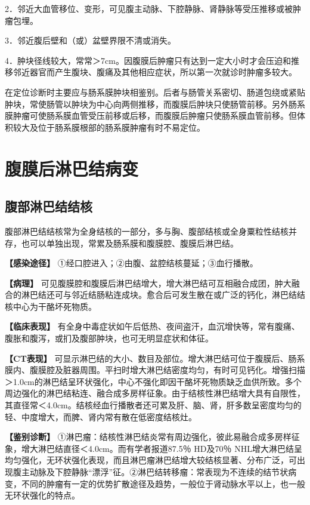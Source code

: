 2．邻近大血管移位、变形，可见腹主动脉、下腔静脉、肾静脉等受压推移或被肿瘤包埋。

3．邻近腹后壁和（或）盆壁界限不清或消失。

4．肿块径线较大，常常＞7cm。因腹膜后肿瘤只有达到一定大小时才会压迫和推移邻近器官而产生腹块、腹痛及其他相应症状，所以第一次就诊时肿瘤多较大。

在定位诊断时主要应与肠系膜肿块相鉴别。后者与肠管关系密切、肠道包绕或紧贴肿块，常使肠管以肿块为中心向两侧推移，而腹膜后肿块只使肠管前移。另外肠系膜肿瘤可使肠系膜血管受压前移或后移，而腹膜后肿瘤只使肠系膜血管前移。但体积较大及位于肠系膜根部的肠系膜肿瘤有时不易定位。

\section{腹膜后淋巴结病变}

\subsection{腹部淋巴结结核}

腹部淋巴结结核常为全身结核的一部分，多与胸、腹部结核或全身粟粒性结核并存，也可以单独出现，常累及肠系膜和腹膜腔、腹膜后淋巴结。

\textbf{【感染途径】} ①经口腔进入；②由腹、盆腔结核蔓延；③血行播散。

\textbf{【病理】}
可见腹膜腔和腹膜后淋巴结增大，增大淋巴结可互相融合成团，肿大融合的淋巴结还可与邻近结肠粘连成块。愈合后可发生散在或广泛的钙化，淋巴结结核中心为干酪坏死物质。

\textbf{【临床表现】}
有全身中毒症状如午后低热、夜间盗汗，血沉增快等，常有腹痛、腹胀和腹泻，或扪及腹部肿块，也可无明显症状和体征。

\textbf{【CT表现】}
可显示淋巴结的大小、数目及部位。增大淋巴结可位于腹膜后、肠系膜内、腹膜腔及脏器周围。平扫时增大淋巴结密度均匀，有时可见钙化。增强扫描＞1.0cm的淋巴结呈环状强化，中心不强化即因干酪坏死物质缺乏血供所致。多个周边强化的淋巴结粘连、融合成多房样征象。由于结核性淋巴结增大具有自限性，其直径常＜4.0cm。结核经血行播散者还可累及肝、脑、肾，肝多数呈密度均匀的轻、中度增大，而脾、肾内常有散在低密度结核灶。

\textbf{【鉴别诊断】}
①淋巴瘤：结核性淋巴结炎常有周边强化，彼此易融合成多房样征象，增大淋巴结直径＜4.0cm。而有学者报道87.5％
HD及70％
NHL增大淋巴结呈均匀强化，无环状强化表现，而且淋巴瘤淋巴结增大较结核显著、分布广泛，可出现腹主动脉及下腔静脉“漂浮”征。②淋巴结转移瘤：常表现为不连续的结节状病变，不同的肿瘤有一定的优势扩散途径及趋势，一般位于肾动脉水平以上，也一般无环状强化的特点。

